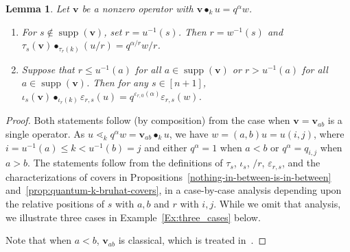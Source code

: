 \documentclass[12pt,oneside,reqno]{amsart}
\newtheorem{lemma}[theorem]{Lemma}
\theoremstyle{definition}
\numberwithin{equation}{section}
\newcommand{\qv}{{\mathbf v}}
\DeclareMathOperator{\supp}{supp}
\DeclareMathOperator{\kactionop}{{\scriptstyle \bullet}}
\newcommand{\kaction}[1][k]{\kactionop_{#1}}
\begin{document}
\begin{lemma}\label{L:relative-labels}
  Let $\qv$ be a nonzero operator with $\qv\kaction u=q^\alpha w$.
  \begin{enumerate}[label=(\roman*)]
  \item\label{L:r-l:i}
    For $s\not\in\supp(\qv)$, set $r=u^{-1}(s)$.
    Then $r=w^{-1}(s)$ and $\tau_s(\qv) {\kactionop}_{\tau_r(k)} (u/r) = q^{\alpha/r} w/r$.
  \item \label{L:r-l:ii}
    Suppose that $r\leq u^{-1}(a)$ for all $a\in\supp(\qv)$ or $r>u^{-1}(a)$ for all $a\in\supp(\qv)$.
    Then for any $s\in[n{+}1]$, $\iota_s(\qv)\kactionop_{\iota_r(k)} \varepsilon_{r,s}(u) = q^{\varepsilon_{r,0}(\alpha)}\varepsilon_{r,s}(w)$.
  \end{enumerate}
\end{lemma}


\begin{proof}
  Both statements follow (by composition) from the case when $\qv=\qv_{ab}$ is a single operator.
  As $u\lessdot_k q^\alpha w=\qv_{ab}\kaction u$, we have
  $w=(a,b)u=u(i,j)$, where $i=u^{-1}(a)\leq k < u^{-1}(b)=j$ and either $q^\alpha=1$ when $a<b$ or $q^\alpha=q_{i,j}$ when $a>b$.
  The statements follow from the definitions of $\tau_s$, $\iota_s$, $/r$, $\varepsilon_{r,s}$, and the
  characterizations of covers in Propositions~\ref{nothing-in-between-is-in-between} and~\ref{prop:quantum-k-bruhat-covers}, in a
  case-by-case analysis depending upon the relative positions of $s$ with $a,b$ and $r$ with $i,j$.
  While we omit that analysis, we illustrate three cases in Example~\ref{Ex:three_cases} below.

  Note that when $a<b$, $\qv_{ab}$ is classical, which is treated in~\cite{BS-Bruhat,BS-Monoid}.
\end{proof}
\end{document}

